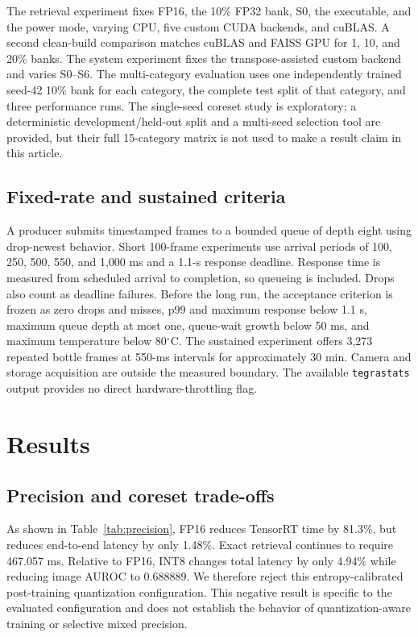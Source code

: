 \documentclass[twocolumn]{svjour3}
\begin{document}
The retrieval experiment fixes FP16, the 10\% FP32 bank, S0, the executable,
and the power mode, varying CPU, five custom CUDA backends, and cuBLAS. A second
clean-build comparison matches cuBLAS and FAISS GPU for 1, 10, and 20\% banks.
The system experiment fixes the transpose-assisted custom backend and varies
S0--S6. The multi-category evaluation uses one independently trained seed-42
10\% bank for each category, the complete test split of that category, and
three performance runs. The single-seed coreset study is exploratory; a
deterministic development/held-out split and a multi-seed selection tool are
provided, but their full 15-category matrix is not used to make a result claim
in this article.

\subsection{Fixed-rate and sustained criteria}
A producer submits timestamped frames to a bounded queue of depth eight using
drop-newest behavior. Short 100-frame experiments use arrival periods of 100,
250, 500, 550, and 1,000 ms and a 1.1-s response deadline. Response time is
measured from scheduled arrival to completion, so queueing is included. Drops
also count as deadline failures. Before the long run, the acceptance criterion
is frozen as zero drops and misses, p99 and maximum response below 1.1 s,
maximum queue depth at most one, queue-wait growth below 50 ms, and maximum
temperature below 80$^\circ$C. The sustained experiment offers 3,273 repeated
bottle frames at 550-ms intervals for approximately 30 min. Camera and storage
acquisition are outside the measured boundary. The available
\texttt{tegrastats} output provides no direct hardware-throttling flag.

\section{Results}\label{sec:results}
\subsection{Precision and coreset trade-offs}
As shown in Table~\ref{tab:precision}, FP16 reduces TensorRT time by 81.3\%,
but reduces end-to-end latency by only 1.48\%. Exact retrieval continues to
require 467.057 ms. Relative to FP16, INT8 changes total latency by only 4.94\%
while reducing image AUROC to 0.688889. We therefore reject this
entropy-calibrated post-training quantization configuration. This negative
result is specific to the evaluated configuration and does not establish the
behavior of quantization-aware training or selective mixed precision.
\end{document}
